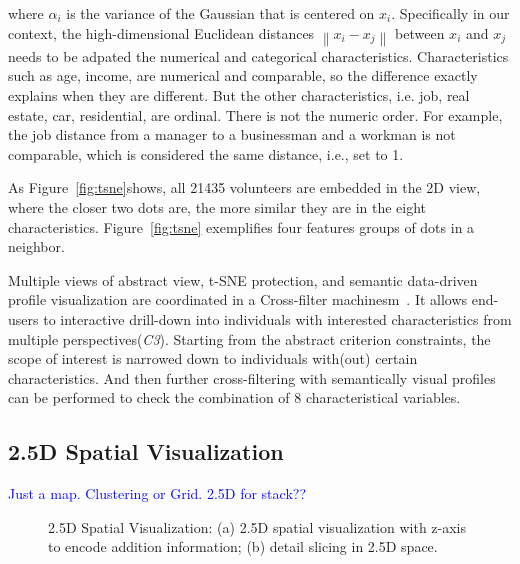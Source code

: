 where $\alpha_i$ is the variance of the Gaussian that is centered on $x_i$. Specifically in our context, the high-dimensional Euclidean distances $\left \| x_i - x_j \right \|$ between $x_i$ and $x_j$ needs to be adpated the numerical and categorical characteristics. Characteristics such as age, income, are numerical and comparable, so the difference exactly explains when they are different. But the other characteristics, i.e. job, real estate, car, residential, are ordinal. There is not the numeric order. For example, the job distance from a manager to a businessman and a workman is not comparable, which is considered the same distance, i.e., set to 1.




As Figure~\ref{fig:tsne}shows, all 21435 volunteers are embedded in the 2D view, where the closer two dots are, the more similar they are in the eight characteristics. Figure~\ref{fig:tsne} exemplifies four features groups of dots in a neighbor.

Multiple views of abstract view, t-SNE protection, and semantic data-driven profile visualization are coordinated in a Cross-filter machinesm~\citep{Weaver2010}. It allows end-users to interactive drill-down into individuals with interested characteristics from multiple perspectives(\textit{C3}). Starting from the abstract criterion constraints, the scope of interest is narrowed down to individuals with(out) certain characteristics. And then further cross-filtering with semantically visual profiles can be performed to check the combination of 8 characteristical variables.


\subsection{2.5D Spatial Visualization}
\textcolor{blue}{Just a map. Clustering or Grid. 2.5D for stack??}

\label{subsec:25D}

\begin{figure}[htb!]
\centering
{}\hspace{5pt}
\hspace{5pt}
\caption{2.5D Spatial Visualization: (a) 2.5D spatial visualization with z-axis to encode addition information; (b) detail slicing in 2.5D space.}
\label{fig:2.5D}
\end{figure}


